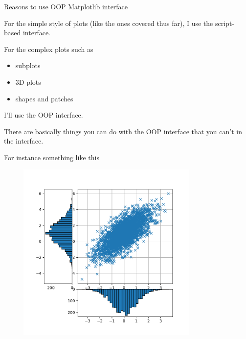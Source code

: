\documentclass[10pt]{beamer}
\begin{document}

\begin{frame}{Reasons to use OOP Matplotlib interface}

For the simple style of plots (like the ones covered thus far), I use the script-based interface.

For the complex plots such as
\begin{itemize}
\item subplots 
\item 3D plots
\item shapes and patches
\end{itemize}
I'll use the OOP interface.

There are basically things you can do with the OOP interface that you can't in the interface.
\end{frame}

\begin{frame}{For instance something like this}
\begin{figure}
\includegraphics[width=0.8\textwidth]{figs/bivar.pdf}
\end{figure}
\end{frame}
\end{document}
